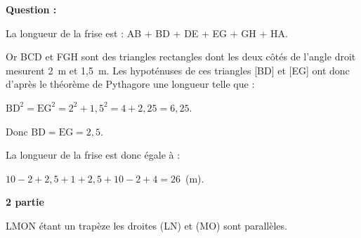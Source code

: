 \smallskip

\textbf{Question :}


La longueur de la frise est : AB + BD + DE + EG + GH + HA.

Or BCD et FGH sont des triangles rectangles dont les deux côtés de l'angle droit mesurent 2~m et 1,5~m. Les hypoténuses de ces triangles [BD] et [EG] ont donc d'après le théorème de Pythagore une longueur telle que :

$\text{BD}^2 = \text{EG}^2 = 2^2 + 1,5^2 = 4 + 2,25 = 6,25$.

Donc $\text{BD} = \text{EG} = 2,5$.

La longueur de la frise est donc égale à :

$10 - 2 + 2,5 + 1 + 2,5 + 10 - 2 + 4 = 26$~(m).

\bigskip

\textbf{2 partie}

%
%
%
%
%
%
%
%
LMON étant un trapèze les droites (LN) et (MO) sont parallèles.

